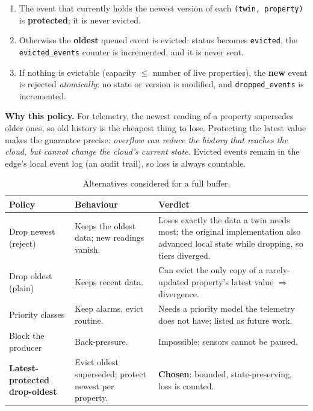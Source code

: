 \documentclass[11pt,a4paper]{article}
\begin{document}
\begin{enumerate}[nosep]
\item The event that currently holds the newest version of each \texttt{(twin, property)} is
\textbf{protected}; it is never evicted.
\item Otherwise the \textbf{oldest} queued event is evicted: status becomes \texttt{evicted}, the
\texttt{evicted\_events} counter is incremented, and it is never sent.
\item If nothing is evictable (capacity $\le$ number of live properties), the \textbf{new} event is
rejected \emph{atomically}: no state or version is modified, and \texttt{dropped\_events} is incremented.
\end{enumerate}

\textbf{Why this policy.} For telemetry, the newest reading of a property supersedes older ones, so old history
is the cheapest thing to lose. Protecting the latest value makes the guarantee precise:
\emph{overflow can reduce the history that reaches the cloud, but cannot change the cloud's current state.}
Evicted events remain in the edge's local event log (an audit trail), so loss is always countable.

\begin{table}[H]\centering\small
\caption{Alternatives considered for a full buffer.}
\begin{tabularx}{\textwidth}{>{\raggedright}p{3.3cm}>{\raggedright}X>{\raggedright\arraybackslash}X}
\toprule
Policy & Behaviour & Verdict\\\midrule
Drop newest (reject) & Keeps the oldest data; new readings vanish. & Loses exactly the data a twin needs most; the original implementation also advanced local state while dropping, so tiers diverged.\\
Drop oldest (plain) & Keeps recent data. & Can evict the only copy of a rarely-updated property's latest value $\Rightarrow$ divergence.\\
Priority classes & Keep alarms, evict routine. & Needs a priority model the telemetry does not have; listed as future work.\\
Block the producer & Back-pressure. & Impossible: sensors cannot be paused.\\
\textbf{Latest-protected drop-oldest} & Evict oldest superseded; protect newest per property. & \textbf{Chosen}: bounded, state-preserving, loss is counted.\\\bottomrule
\end{tabularx}
\end{table}
\end{document}
